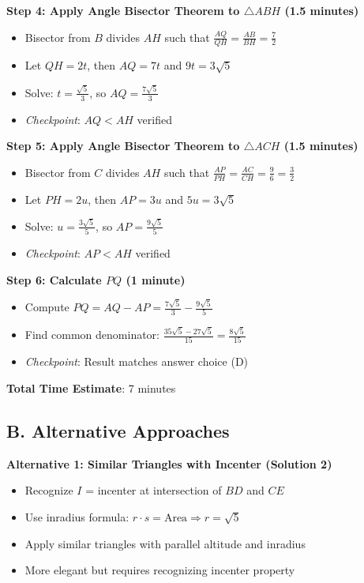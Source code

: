 \documentclass[12pt]{article}
\begin{document}
\begin{roadmapbox}
\textbf{Step 4: Apply Angle Bisector Theorem to $\triangle ABH$ (1.5 minutes)}
\begin{itemize}
    \item Bisector from $B$ divides $AH$ such that $\frac{AQ}{QH} = \frac{AB}{BH} = \frac{7}{2}$
    \item Let $QH = 2t$, then $AQ = 7t$ and $9t = 3\sqrt{5}$
    \item Solve: $t = \frac{\sqrt{5}}{3}$, so $AQ = \frac{7\sqrt{5}}{3}$
    \item \textit{Checkpoint}: $AQ < AH$ verified
\end{itemize}

\textbf{Step 5: Apply Angle Bisector Theorem to $\triangle ACH$ (1.5 minutes)}
\begin{itemize}
    \item Bisector from $C$ divides $AH$ such that $\frac{AP}{PH} = \frac{AC}{CH} = \frac{9}{6} = \frac{3}{2}$
    \item Let $PH = 2u$, then $AP = 3u$ and $5u = 3\sqrt{5}$
    \item Solve: $u = \frac{3\sqrt{5}}{5}$, so $AP = \frac{9\sqrt{5}}{5}$
    \item \textit{Checkpoint}: $AP < AH$ verified
\end{itemize}

\textbf{Step 6: Calculate $PQ$ (1 minute)}
\begin{itemize}
    \item Compute $PQ = AQ - AP = \frac{7\sqrt{5}}{3} - \frac{9\sqrt{5}}{5}$
    \item Find common denominator: $\frac{35\sqrt{5} - 27\sqrt{5}}{15} = \frac{8\sqrt{5}}{15}$
    \item \textit{Checkpoint}: Result matches answer choice (D)
\end{itemize}

\textbf{Total Time Estimate}: 7 minutes

\subsection*{B. Alternative Approaches}

\textbf{Alternative 1: Similar Triangles with Incenter (Solution 2)}
\begin{itemize}
    \item Recognize $I$ = incenter at intersection of $BD$ and $CE$
    \item Use inradius formula: $r \cdot s = \text{Area} \Rightarrow r = \sqrt{5}$
    \item Apply similar triangles with parallel altitude and inradius
    \item More elegant but requires recognizing incenter property
\end{itemize}


\end{roadmapbox}
\end{document}
